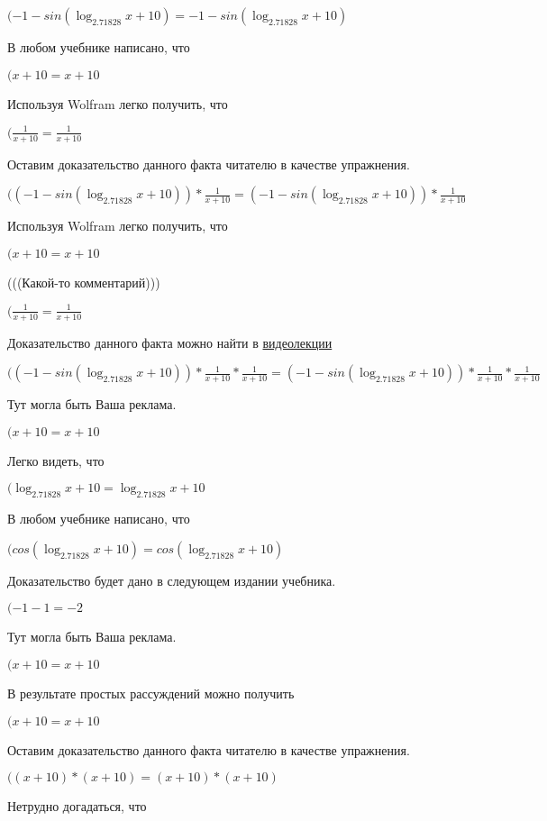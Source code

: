 \documentclass[12pt,a4paper,fleqn]{article}
\theoremstyle{definition}
\begin{document}
$( -1  - sin(\log_{ 2.71828 }{ x  +  10 }) =  -1  - sin(\log_{ 2.71828 }{ x  +  10 })$

В любом учебнике написано, что

$( x  +  10  =  x  +  10 $

Используя Wolfram легко получить, что

$(\frac{ 1 }{ x  +  10 }
 = \frac{ 1 }{ x  +  10 }
$

Оставим доказательство данного факта читателю в качестве упражнения.

$(( -1  - sin(\log_{ 2.71828 }{ x  +  10 })) * \frac{ 1 }{ x  +  10 }
 = ( -1  - sin(\log_{ 2.71828 }{ x  +  10 })) * \frac{ 1 }{ x  +  10 }
$

Используя Wolfram легко получить, что

$( x  +  10  =  x  +  10 $

(((Какой-то комментарий)))

$(\frac{ 1 }{ x  +  10 }
 = \frac{ 1 }{ x  +  10 }
$

Доказательство данного факта можно найти в \href{https://www.youtube.com/watch?v=dQw4w9WgXcQ}{видеолекции}

$(( -1  - sin(\log_{ 2.71828 }{ x  +  10 })) * \frac{ 1 }{ x  +  10 }
 * \frac{ 1 }{ x  +  10 }
 = ( -1  - sin(\log_{ 2.71828 }{ x  +  10 })) * \frac{ 1 }{ x  +  10 }
 * \frac{ 1 }{ x  +  10 }
$

Тут могла быть Ваша реклама.

$( x  +  10  =  x  +  10 $

Легко видеть, что

$(\log_{ 2.71828 }{ x  +  10 } = \log_{ 2.71828 }{ x  +  10 }$

В любом учебнике написано, что

$(cos(\log_{ 2.71828 }{ x  +  10 }) = cos(\log_{ 2.71828 }{ x  +  10 })$

Доказательство будет дано в следующем издании учебника.

$( -1  -  1  =  -2 $

Тут могла быть Ваша реклама.

$( x  +  10  =  x  +  10 $

В результате простых рассуждений можно получить

$( x  +  10  =  x  +  10 $

Оставим доказательство данного факта читателю в качестве упражнения.

$(( x  +  10 ) * ( x  +  10 ) = ( x  +  10 ) * ( x  +  10 )$

Нетрудно догадаться, что
\end{document}
